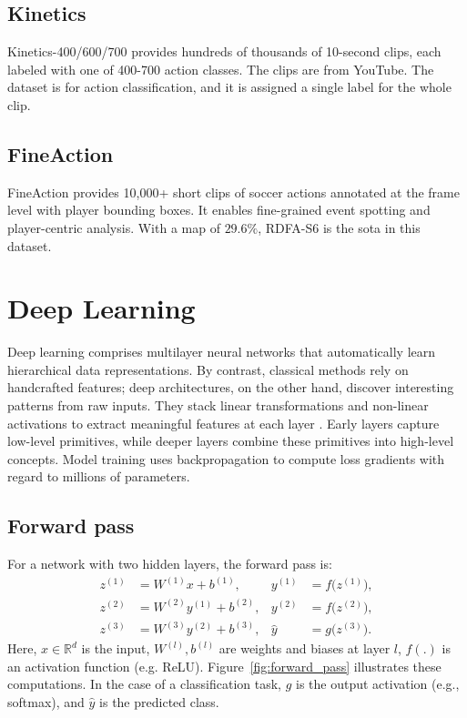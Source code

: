 \subsection{Kinetics}
Kinetics-400/600/700 \cite{dataset:kinetics} provides hundreds of thousands of 10-second clips, each labeled with one of 400-700 action classes. The clips are from YouTube. The dataset is for action classification, and it is assigned a single label for the whole clip. 

\subsection{FineAction}
FineAction \cite{dataset:fineaction} provides 10,000+ short clips of soccer actions annotated at the frame level with player bounding boxes. It enables fine-grained event spotting and player-centric analysis. With a \acrshort{map} of $29.6\%$, RDFA-S6 is the \acrshort{sota} in this dataset.

\section{Deep Learning} 
\label{sec:deep_learning}

Deep learning comprises multilayer neural networks that automatically learn hierarchical data representations. By contrast, classical methods rely on handcrafted features; deep architectures, on the other hand, discover interesting patterns from raw inputs. They stack linear transformations and non-linear activations to extract meaningful features at each layer \cite{lecun_deep_learning_2015}. 
Early layers capture low-level primitives, while deeper layers combine these primitives into high-level concepts. Model training uses backpropagation to compute loss gradients with regard to millions of parameters. 

\subsection{Forward pass}
For a network with two hidden layers, the forward pass is:
\begin{align}
z^{(1)} &= W^{(1)} x + b^{(1)}, & y^{(1)} &= f\bigl(z^{(1)}\bigr), \\
z^{(2)} &= W^{(2)} y^{(1)} + b^{(2)}, & y^{(2)} &= f\bigl(z^{(2)}\bigr), \\
z^{(3)} &= W^{(3)} y^{(2)} + b^{(3)}, & \hat{y} &= g\bigl(z^{(3)}\bigr).
\end{align}
Here, \(x\in\mathbb{R}^d\) is the input, \(W^{(l)},b^{(l)}\) are weights and biases at layer \(l\), \(f(.)\) is an activation function (e.g. ReLU). Figure~\ref{fig:forward_pass} illustrates these computations. In the case of a classification task, \(g\) is the output activation (e.g., softmax), and \(\hat{y}\) is the predicted class.

